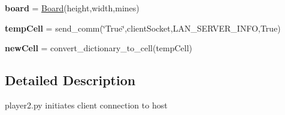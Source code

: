 \begin{DoxyCompactItemize}
{\bfseries board} = \hyperlink{class_board_1_1_board}{Board}(height,width,mines)
\item 
\mbox{\label{namespaceplayer2_ae13161ccd361fd36c6cbd757f33d639b}} 
{\bfseries temp\+Cell} = send\+\_\+comm(\char`\"{}True\char`\"{},client\+Socket,L\+A\+N\+\_\+\+S\+E\+R\+V\+E\+R\+\_\+\+I\+N\+FO,True)
\item 
\mbox{\label{namespaceplayer2_a025745245d0584f1418eb0898b79057a}} 
{\bfseries new\+Cell} = convert\+\_\+dictionary\+\_\+to\+\_\+cell(temp\+Cell)
\end{DoxyCompactItemize}


\subsection{Detailed Description}
\begin{DoxyVerb}player2.py
initiates client connection to host
\end{DoxyVerb}
 